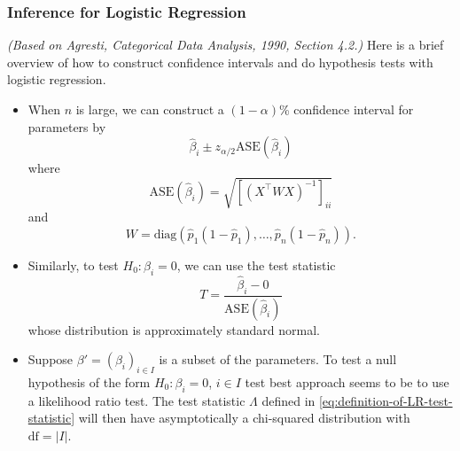 \documentclass[10pt]{article}
\theoremstyle{definition}
\newcommand{\1}[1]{\textbf{1}_{\left[#1\right]}} %
\begin{document}
\subsubsection{Inference for Logistic Regression}
\textit{(Based on Agresti, Categorical Data Analysis, 1990, Section 4.2.)}
Here is a brief overview of how to construct confidence intervals and do
hypothesis tests with logistic regression.
\begin{itemize}
  \item When $n$ is large, we can construct a $(1-\alpha)$\% confidence
  interval for parameters by
  \begin{equation*}
    \widehat{\beta}_{i} \pm z_{\alpha/2}\mathrm{ASE}(\widehat{\beta}_{i})
  \end{equation*}
  where
  \begin{equation*}
    \mathrm{ASE}(\widehat{\beta}_{i}) = \sqrt{\left[ (X^{\top}WX)^{-1} \right]_{ii} }
  \end{equation*}
  and
  \begin{equation*}
    W = \mathrm{diag}(\widehat{p}_{1}(1-\widehat{p}_{1}),\ldots,\widehat{p}_{n}(1-\widehat{p}_{n})).
  \end{equation*}
  \item Similarly, to test $H_{0}: \beta_{i}=0$, we can use the test statistic
  \begin{equation*}
    T = \frac{\widehat{\beta}_{i}-0}{\text{ASE}(\widehat{\beta}_{i})}
  \end{equation*}
  whose distribution is approximately standard normal.
  \item Suppose $\beta' = (\beta_{i})_{i\in I}$ is a subset of the parameters.
  To test a null hypothesis of the form $H_{0}:\beta_{i}=0$, $i\in I$ test
  best approach seems to be to use a likelihood ratio test. The test statistic
  $\Lambda$ defined in \cref{eq:definition-of-LR-test-statistic} will then
  have asymptotically a chi-squared distribution with $\mathrm{df}=|I|$.
\end{itemize}
\end{document}
